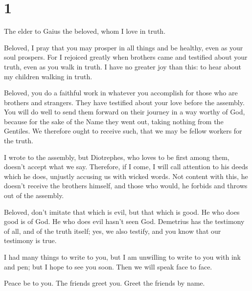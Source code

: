 \hypertarget{section}{%
\section{1}\label{section}}

 The elder to Gaius the beloved, whom I love in truth.

 Beloved, I pray that you may prosper in all things and be
healthy, even as your soul prospers.  For I rejoiced greatly
when brothers came and testified about your truth, even as you walk in
truth.  I have no greater joy than this: to hear about my
children walking in truth.

 Beloved, you do a faithful work in whatever you accomplish
for those who are brothers and strangers.  They have
testified about your love before the assembly. You will do well to send
them forward on their journey in a way worthy of God, 
because for the sake of the Name they went out, taking nothing from the
Gentiles.  We therefore ought to receive such, that we may
be fellow workers for the truth.

 I wrote to the assembly, but Diotrephes, who loves to be
first among them, doesn't accept what we say.  Therefore,
if I come, I will call attention to his deeds which he does, unjustly
accusing us with wicked words. Not content with this, he doesn't receive
the brothers himself, and those who would, he forbids and throws out of
the assembly.

 Beloved, don't imitate that which is evil, but that which
is good. He who does good is of God. He who does evil hasn't seen God.
 Demetrius has the testimony of all, and of the truth
itself; yes, we also testify, and you know that our testimony is true.

 I had many things to write to you, but I am unwilling to
write to you with ink and pen;  but I hope to see you soon.
Then we will speak face to face.

Peace be to you. The friends greet you. Greet the friends by name.
